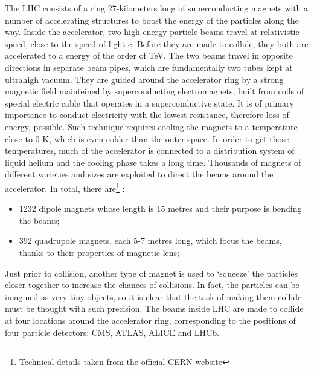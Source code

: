 \documentclass[../../main.tex]{subfiles}
\begin{document}
The LHC consists of a ring 27-kilometers long of superconducting magnets with a number of accelerating structures to boost the energy of the particles along the way. Inside the accelerator, two high-energy particle beams travel at relativistic speed, close to the speed of light c. Before they are made to collide, they both are accelerated to a energy of the order of TeV. The two beams travel in opposite directions in separate beam pipes, which are fundamentally two tubes kept at ultrahigh vacuum. They are guided around the accelerator ring by a strong magnetic field mainteined by superconducting electromagnets, built from coils of special electric cable that operates in a superconductive state. It is of primary importance to conduct electricity with the lowest resistance, therefore loss of energy, possible. Such technique requires cooling the magnets to a temperature close to 0 K, which is even colder than the outer space. In order to get those temperatures, much of the accelerator is connected to a distribution system of liquid helium and the cooling phase takes a long time. Thousands of magnets of different varieties and sizes are exploited to direct the beams around the accelerator. In total, there are\footnote{Technical details taken from the official CERN website\cite{LHC}} :
\begin{itemize}
    \item 1232 dipole magnets whose length is 15 metres and their purpose is bending the beams;
    \item 392 quadrupole magnets, each 5-7 metres long, which focus the beams, thanks to their properties
    of magnetic lens;
\end{itemize}
Just prior to collision, another type of magnet is used to ‘squeeze’ the particles closer together to increase the chances of collisions. In fact, the particles can be imagined as very tiny objects, so it is clear that the task of making them collide must be thought with such precision. The beams inside LHC are made to collide at four locations around the accelerator ring, corresponding to the positions of four particle detectors: CMS, ATLAS, ALICE and LHCb.  
    
\end{document}
